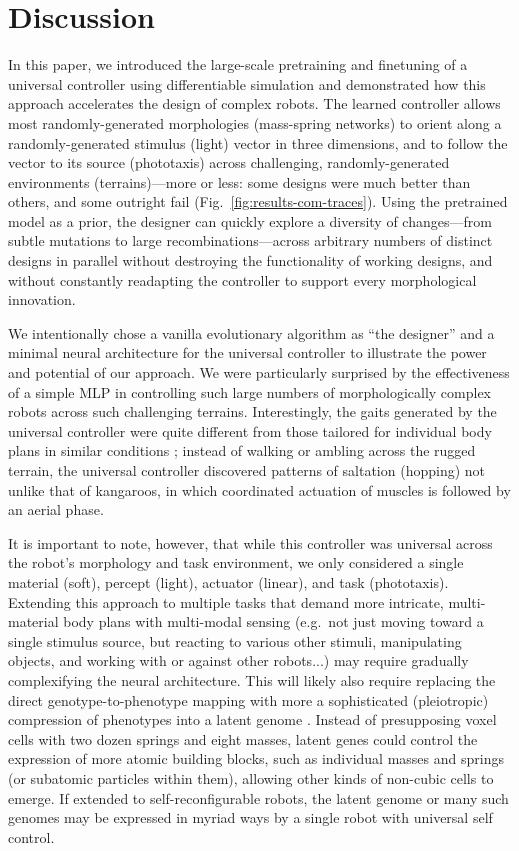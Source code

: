 \section{Discussion}
\label{sec:discussion}

 
In this paper, we introduced 
the large-scale pretraining and finetuning of a universal controller using differentiable simulation
and demonstrated how this approach
accelerates the 
design
of complex robots.
% 
The learned controller 
allows most 
randomly-generated morphologies (mass-spring networks)
to orient along a randomly-generated stimulus (light) vector in three dimensions, 
and to follow the vector to its source (phototaxis)
across challenging, randomly-generated environments (terrains)---more or less: 
some designs were much better
than others, and some outright fail (Fig.~\ref{fig:results-com-traces}).
Using the pretrained model as a prior, the designer 
can quickly
explore a diversity of changes---from subtle mutations to large recombinations---across
arbitrary numbers of
distinct designs in parallel
without destroying the functionality of working designs, and without constantly readapting the controller to support every morphological innovation.

We intentionally chose a vanilla evolutionary algorithm 
as ``the designer'' 
and a minimal neural architecture for the universal controller
to illustrate the power and potential of our approach.
We were particularly surprised by the effectiveness of a simple MLP in controlling 
such large numbers of morphologically complex robots 
across such challenging terrains.
Interestingly, the gaits generated by the universal controller were quite different from those 
tailored for individual body plans
in similar conditions 
\cite{strgar2024evolution};
instead of walking or ambling across the rugged terrain,
the universal controller
discovered patterns of saltation
(hopping) not unlike that of kangaroos, in which coordinated actuation of muscles is followed by an aerial phase.


It is important to note, however, that while this controller was universal across the robot's morphology and task environment, 
we only considered 
a single
material (soft),
percept (light),
actuator (linear),
and task (phototaxis).
Extending this approach to multiple tasks 
that demand 
more intricate, multi-material body plans with
multi-modal sensing
(e.g.~not just moving toward a single stimulus source, 
but reacting to various other stimuli, 
manipulating objects, 
and working with or against other robots...)
may require gradually complexifying the neural architecture.
This will likely also require replacing the direct genotype-to-phenotype mapping with
more a sophisticated (pleiotropic)
compression of phenotypes 
into a latent genome
\cite{li2025generating}.
Instead of presupposing voxel cells with
two dozen springs and eight masses,
latent genes could control the expression of more atomic building blocks,
such as individual masses and springs (or subatomic particles within them),
allowing other kinds of non-cubic cells \cite{hummer2024noncubic} to emerge.
If extended to self-reconfigurable robots, the latent genome or many such genomes may be expressed in myriad ways by a single robot with universal self control.
% 

